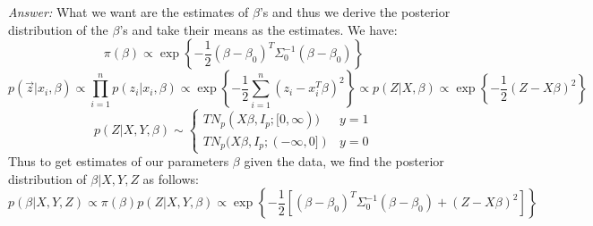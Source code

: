 \documentclass[a4paper, 11pt]{report}
\begin{document}
	\noindent\textit{Answer:} What we want are the estimates of $\beta$'s and thus we derive the posterior distribution of the $\beta$'s and take their means as the estimates.  We have:
	$$ \pi(\beta) \propto \exp\left\lbrace -\frac{1}{2}\left(\beta-\beta_0\right)^T\Sigma_0^{-1}\left(\beta-\beta_0\right)   \right\rbrace$$
	$$ p(\vec{z} \vert x_i,\beta) \propto \prod_{i=1}^{n}p(z_i \vert x_i, \beta) \propto \exp\left\lbrace -\frac{1}{2}\sum_{i=1}^{n}\left(z_i -				
		x_i^T\beta \right)^2 \right\rbrace \propto p(Z \vert X,\beta) \propto \exp\left\lbrace -\frac{1}{2}\left(Z-X\beta \right)^2 \right\rbrace$$
	$$ p(Z \vert X,Y,\beta) \sim \begin{cases} 	TN_p(X\beta,I_p;[0,\infty)) & y = 1 \\  TN_p(X\beta,I_p;(-\infty,0]) & y = 0 \end{cases}$$
	Thus to get estimates of our parameters $\beta$ given the data, we find the posterior distribution of $\beta | X,Y,Z$ as follows:
	$$ p(\beta \vert X,Y,Z) \propto \pi(\beta)p(Z \vert X,Y,\beta) \propto \exp\left\lbrace -\frac{1}{2}\left[\left(\beta-\beta_0\right)^T\Sigma_0^{-1}\left(\beta-\beta_0\right) + \left(Z-X\beta \right)^2 \right]  \right\rbrace $$
\end{document}
